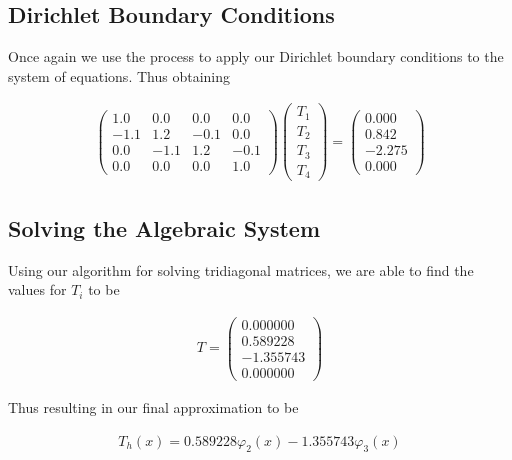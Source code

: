 \documentclass[10pt]{amsart}
\numberwithin{equation}{section}
\theoremstyle{definition}
\begin{document}
\begin{multicols}{2}
\subsection{Dirichlet Boundary Conditions}%
\label{sub:dirichlet_boundary_conditions}

Once again we use the process to apply our Dirichlet boundary conditions to the
system of equations. Thus obtaining

\begin{align*}
  \begin{pmatrix}
    1.0 &  0.0 & 0.0 & 0.0 \\
    -1.1 & 1.2 & -0.1 & 0.0 \\
    0.0 & -1.1 & 1.2 & -0.1 \\
    0.0 &  0.0 & 0.0 & 1.0
  \end{pmatrix}
  \begin{pmatrix}
    T_1 \\ T_2 \\ T_3 \\ T_4
  \end{pmatrix}
  =
  \begin{pmatrix}
    0.000 \\ 0.842 \\ -2.275 \\ 0.000
  \end{pmatrix}
\end{align*}

\subsection{Solving the Algebraic System}%
\label{sub:solving_the_algebraic_system}

Using our algorithm for solving tridiagonal matrices, we are able to find the
values for $T_i$ to be

\begin{align*}
  T=\begin{pmatrix}
    0.000000 \\ 0.589228 \\ -1.355743 \\ 0.000000
  \end{pmatrix}
\end{align*}

Thus resulting in our final approximation to be

\begin{align*}
  T_h(x) = 0.589228\varphi_2(x)-1.355743\varphi_3(x)
\end{align*}


\end{multicols}
\end{document}
